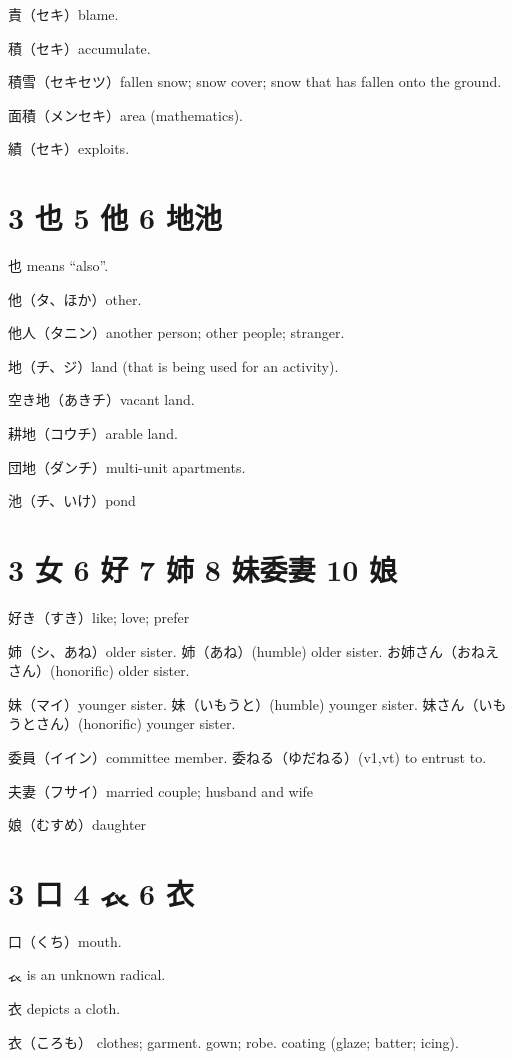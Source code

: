 責（セキ）blame.

積（セキ）accumulate.

積雪（セキセツ）fallen snow;
snow cover;
snow that has fallen onto the ground.

面積（メンセキ）area (mathematics).

績（セキ）exploits.

\section{3 也 5 他 6 地池}

也 means ``also''.

他（タ、ほか）other.

他人（タニン）another person; other people; stranger.

地（チ、ジ）land (that is being used for an activity).

空き地（あきチ）vacant land.

耕地（コウチ）arable land.

団地（ダンチ）multi-unit apartments.

池（チ、いけ）pond

\section{3 女 6 好 7 姉 8 妹委妻 10 娘}

好き（すき）like; love; prefer

姉（シ、あね）older sister.
姉（あね）(humble) older sister.
お姉さん（おねえさん）(honorific) older sister.

妹（マイ）younger sister.
妹（いもうと）(humble) younger sister.
妹さん（いもうとさん）(honorific) younger sister.

委員（イイン）committee member.
委ねる（ゆだねる）(v1,vt) to entrust to.

夫妻（フサイ）married couple; husband and wife

娘（むすめ）daughter

\section{3 口 4 𧘇 6 衣}

口（くち）mouth.

𧘇 is an unknown radical.

衣 depicts a cloth.

衣（ころも）
clothes;
garment. gown;
robe. coating (glaze; batter; icing).

